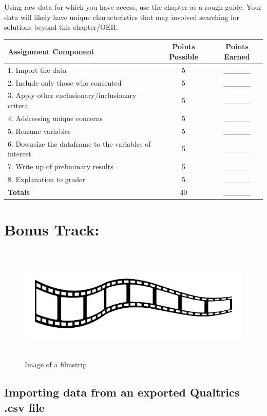 \documentclass[
  english,
]{book}
\begin{document}
Using raw data for which you have access, use the chapter as a rough guide. Your data will likely have unique characteristics that may involved searching for solutions beyond this chapter/OER.

\begin{longtable}[]{@{}lcc@{}}
\toprule
Assignment Component & Points Possible & Points Earned \\
\midrule
\endhead
1. Import the data & 5 & \_\_\_\_\_ \\
2. Include only those who consented & 5 & \_\_\_\_\_ \\
3. Apply other exclusionary/inclusionary critera & 5 & \_\_\_\_\_ \\
4. Addressing unique concerns & 5 & \_\_\_\_\_ \\
5. Rename variables & 5 & \_\_\_\_\_ \\
6. Downsize the dataframe to the variables of interest & 5 & \_\_\_\_\_ \\
7. Write up of preliminary results & 5 & \_\_\_\_\_ \\
8. Explanation to grader & 5 & \_\_\_\_\_ \\
\textbf{Totals} & 40 & \_\_\_\_\_ \\
\bottomrule
\end{longtable}

\hypertarget{bonus-track}{%
\section{Bonus Track:}\label{bonus-track}}

\begin{figure}
\hypertarget{id}{%
\centering
\includegraphics[width=6.45833in,height=2.19792in]{images/film-strip-1.jpg}
\caption{Image of a filmstrip}\label{id}
}
\end{figure}

\hypertarget{importing-data-from-an-exported-qualtrics-.csv-file}{%
\subsection{Importing data from an exported Qualtrics .csv file}\label{importing-data-from-an-exported-qualtrics-.csv-file}}
\end{document}
